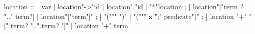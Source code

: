 \begin{syntax}
  location ::= var | location"->"id | location"."id | "*"location ;
       | location"["term ? ".." term?] | location"["term"]" ;
       |  "(""\Forall" \tau")" | "(""\Forall" \tau x ";" predicate")" ;
       |  location "+" "[" term? ".." term? "]" | location "+" term
\end{syntax}
